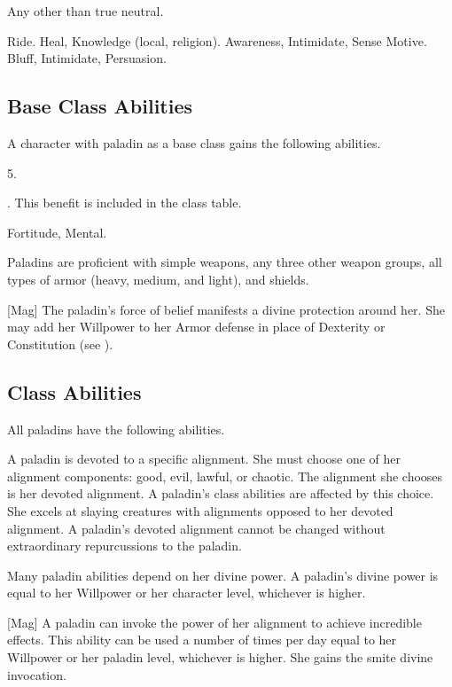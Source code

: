      Any other than true neutral.

     Ride.
     Heal, Knowledge (local, religion).
     Awareness, Intimidate, Sense Motive.
     Bluff, Intimidate, Persuasion.

    \subsection{Base Class Abilities}
        A character with paladin as a base class gains the following abilities.

         5.

         . This benefit is included in the class table.

          Fortitude,  Mental.

        Paladins are proficient with simple weapons, any three other weapon groups, all types of armor (heavy, medium, and light), and shields.

        [Mag]
        The paladin's force of belief manifests a divine protection around her.
        She may add her Willpower to her Armor defense in place of Dexterity or Constitution (see ).

    \subsection{Class Abilities}
        All paladins have the following abilities.

        A paladin is devoted to a specific alignment.
        She must choose one of her alignment components: good, evil, lawful, or chaotic.
        The alignment she chooses is her devoted alignment.
        A paladin's class abilities are affected by this choice.
        She excels at slaying creatures with alignments opposed to her devoted alignment.
        A paladin's devoted alignment cannot be changed without extraordinary repurcussions to the paladin.

        Many paladin abilities depend on her divine power.
        A paladin's divine power is equal to her Willpower or her character level, whichever is higher.

        [Mag]
        A paladin can invoke the power of her alignment to achieve incredible effects.
        This ability can be used a number of times per day equal to her Willpower or her paladin level, whichever is higher.
        She gains the smite divine invocation.

